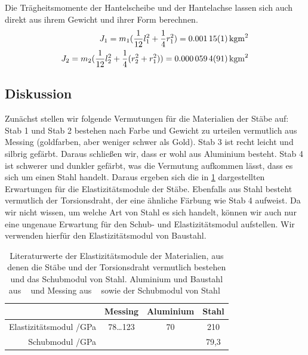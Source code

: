 \documentclass[
	a4paper,
	12pt,
	pagesize,
	ngerman
]{scrartcl}
\begin{document}
	Die Trägheitsmomente der Hantelscheibe und der Hantelachse lassen sich auch direkt aus ihrem Gewicht und ihrer Form berechnen.
	\begin{align}
		J_1 = m_1(\frac{1}{12}l_1^2+\frac{1}{4}r_1^2) = \SI{0,00115 \pm0,00001}{kgm^2}\\
		J_2 = m_2(\frac{1}{12}l_2^2+\frac{1}{4}(r_2^2 + r_1^2))= \SI{0,0000594\pm 0,0000091}{kgm^2}
	\end{align}
	
	\subsection{Diskussion}
	Zunächst stellen wir folgende Vermutungen für die Materialien der Stäbe auf: Stab 1 und Stab 2 bestehen nach Farbe und Gewicht zu urteilen vermutlich aus Messing (goldfarben, aber weniger schwer als Gold). Stab 3 ist recht leicht und silbrig gefärbt. Daraus schließen wir, dass er wohl aus Aluminium besteht. Stab 4 ist schwerer und dunkler gefärbt, was die Vermutung aufkommen lässt, dass es sich um einen Stahl handelt. Daraus ergeben sich die in \cref{Tabelle_Elastizitätsmodule_Literatur} dargestellten Erwartungen für die Elastizitätsmodule der Stäbe. Ebenfalls aus Stahl besteht vermutlich der Torsionsdraht, der eine ähnliche Färbung wie Stab 4 aufweist. Da wir nicht wissen, um welche Art von Stahl es sich handelt, können wir auch nur eine ungenaue Erwartung für den Schub- und Elastizitätsmodul aufstellen. Wir verwenden hierfür den Elastizitätsmodul von Baustahl.
	
	\begin{table}[tb]
		\centering
		\begin{tabular}{ r | c | c | c |}
			&  Messing & Aluminium& Stahl\\ \hline
			Elastizitätsmodul /\si{\giga \pascal} & 78…123 & 70 & 210\\
			Schubmodul /\si{\giga \pascal} & & & 79,3 \\
			\hline
		\end{tabular}
		\caption{Literaturwerte der Elastizitätsmodule der Materialien, aus denen die Stäbe und der Torsionsdraht vermutlich bestehen und das Schubmodul von Stahl. Aluminium und Baustahl aus ~\cite[S. 624 f.]{Taschenbuch} und Messing aus ~\cite[S. E 66.]{Huette} sowie der Schubmodul von Stahl~\cite{Solids}} %
		\label{Tabelle_Elastizitätsmodule_Literatur} 
	\end{table}
	
\end{document}
